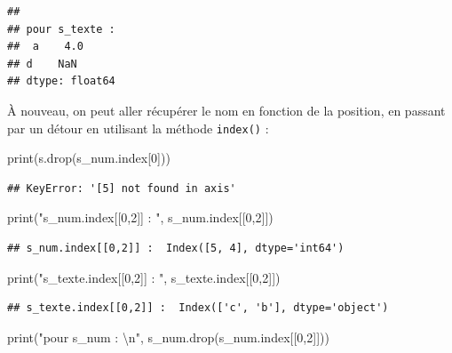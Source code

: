 \documentclass[
  12pt,
]{book}
\newenvironment{Shaded}{\begin{snugshade}}{\end{snugshade}}
\newcommand{\BuiltInTok}[1]{#1}
\newcommand{\CharTok}[1]{\textcolor[rgb]{0.31,0.60,0.02}{#1}}
\newcommand{\DecValTok}[1]{\textcolor[rgb]{0.00,0.00,0.81}{#1}}
\newcommand{\NormalTok}[1]{#1}
\newcommand{\StringTok}[1]{\textcolor[rgb]{0.31,0.60,0.02}{#1}}
\numberwithin{equation}{section}
\numberwithin{countremarque}{section}
\begin{document}
\begin{lstlisting}
## 
## pour s_texte : 
##  a    4.0
## d    NaN
## dtype: float64
\end{lstlisting}

À nouveau, on peut aller récupérer le nom en fonction de la position, en passant par un détour en utilisant la méthode \texttt{index()} :

\begin{Shaded}
\begin{Highlighting}[]
\BuiltInTok{print}\NormalTok{(s.drop(s\_num.index[}\DecValTok{0}\NormalTok{]))}
\end{Highlighting}
\end{Shaded}

\begin{lstlisting}
## KeyError: '[5] not found in axis'
\end{lstlisting}

\begin{Shaded}
\begin{Highlighting}[]
\BuiltInTok{print}\NormalTok{(}\StringTok{"s\_num.index[[0,2]] : "}\NormalTok{, s\_num.index[[}\DecValTok{0}\NormalTok{,}\DecValTok{2}\NormalTok{]])}
\end{Highlighting}
\end{Shaded}

\begin{lstlisting}
## s_num.index[[0,2]] :  Index([5, 4], dtype='int64')
\end{lstlisting}

\begin{Shaded}
\begin{Highlighting}[]
\BuiltInTok{print}\NormalTok{(}\StringTok{"s\_texte.index[[0,2]] : "}\NormalTok{, s\_texte.index[[}\DecValTok{0}\NormalTok{,}\DecValTok{2}\NormalTok{]])}
\end{Highlighting}
\end{Shaded}

\begin{lstlisting}
## s_texte.index[[0,2]] :  Index(['c', 'b'], dtype='object')
\end{lstlisting}

\begin{Shaded}
\begin{Highlighting}[]
\BuiltInTok{print}\NormalTok{(}\StringTok{"pour s\_num : }\CharTok{\textbackslash{}n}\StringTok{"}\NormalTok{, s\_num.drop(s\_num.index[[}\DecValTok{0}\NormalTok{,}\DecValTok{2}\NormalTok{]]))}
\end{Highlighting}
\end{Shaded}
\end{document}

